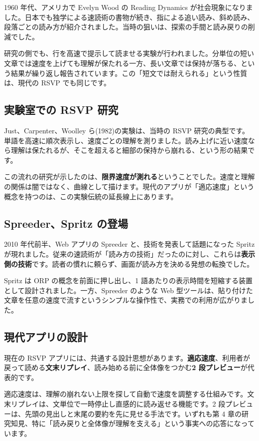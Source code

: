 \documentclass{article}
\begin{document}
1960 年代、アメリカで Evelyn Wood の Reading Dynamics が社会現象になりました。日本でも独学による速読術の書物が続き、指による追い読み、斜め読み、段落ごとの読み方が紹介されました。当時の狙いは、探索の手間と読み戻りの削減でした。

研究の側でも、行を高速で提示して読ませる実験が行われました。分単位の短い文章では速度を上げても理解が保たれる一方、長い文章では保持が落ちる、という結果が繰り返し報告されています。この「短文では耐えられる」という性質は、現代の RSVP でも同じです。

\subsection{実験室での RSVP 研究}

Just、Carpenter、Woolley ら(1982)の実験は、当時の RSVP 研究の典型です。単語を高速に順次表示し、速度ごとの理解を測りました。読み上げに近い速度なら理解は保たれるが、そこを超えると細部の保持から崩れる、という形の結果です。

この流れの研究が示したのは、\textbf{限界速度が測れる}ということでした。速度と理解の関係は闇ではなく、曲線として描けます。現代のアプリが「適応速度」という概念を持つのは、この実験伝統の延長線上にあります。

\subsection{Spreeder、Spritz の登場}

2010 年代前半、Web アプリの Spreeder と、技術を発表して話題になった Spritz が現れました。従来の速読術が「読み方の技術」だったのに対し、これらは\textbf{表示側の技術}です。読者の慣れに頼らず、画面が読み方を決める発想の転換でした。

Spritz は ORP の概念を前面に押し出し、1 語あたりの表示時間を短縮する装置として設計されました。一方、Spreeder のような Web 型ツールは、貼り付けた文章を任意の速度で流すというシンプルな操作性で、実務での利用が広がりました。

\subsection{現代アプリの設計}

現在の RSVP アプリには、共通する設計思想があります。\textbf{適応速度}、利用者が戻って読める\textbf{文末リプレイ}、読み始める前に全体像をつかむ\textbf{2 段プレビュー}が代表的です。

適応速度は、理解の崩れない上限を探して自動で速度を調整する仕組みです。文末リプレイは、文単位で一時停止し直感的に読み返せる機能です。2 段プレビューは、先頭の見出しと末尾の要約を先に見せる手法です。いずれも第 4 章の研究知見、特に「読み戻りと全体像が理解を支える」という事実への応答になっています。
\end{document}
